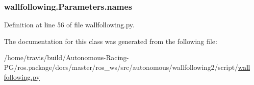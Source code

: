 \subsubsection[{\texorpdfstring{names}{names}}]{\setlength{\rightskip}{0pt plus 5cm}wallfollowing.\+Parameters.\+names}\hypertarget{classwallfollowing_1_1_parameters_a009e7e6821f14f92f657fae2a7315313}{}\label{classwallfollowing_1_1_parameters_a009e7e6821f14f92f657fae2a7315313}


Definition at line 56 of file wallfollowing.\+py.



The documentation for this class was generated from the following file\+:\begin{DoxyCompactItemize}
\item 
/home/travis/build/\+Autonomous-\/\+Racing-\/\+P\+G/ros.\+package/docs/master/ros\+\_\+ws/src/autonomous/wallfollowing2/script/\hyperlink{wallfollowing_8py}{wallfollowing.\+py}\end{DoxyCompactItemize}
